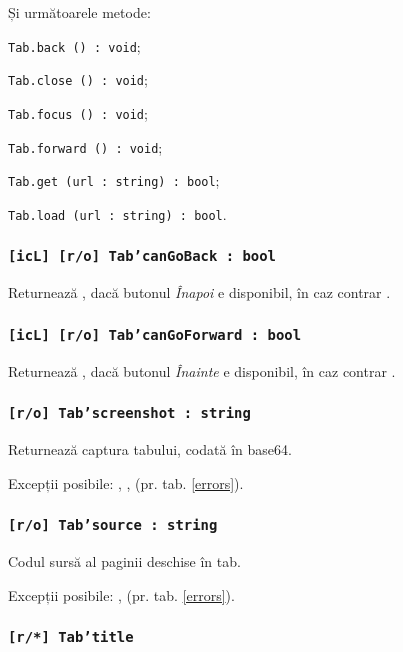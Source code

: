Și următoarele metode:
\begin{icItems}
	\item \texttt{Tab.back () : void};
	\item \texttt{Tab.close () : void};
	\item \texttt{Tab.focus () : void};
	\item \texttt{Tab.forward () : void};
	\item \texttt{Tab.get (url : string) : bool};
	\item \texttt{Tab.load (url : string) : bool}.
\end{icItems}

\subsubsection{\texttt{[icL] [r/o] Tab'canGoBack : bool}}

Returnează \true, dacă butonul \textit{Înapoi} e disponibil, în caz contrar \false.

\subsubsection{\texttt{[icL] [r/o] Tab'canGoForward : bool}}

Returnează \true, dacă butonul \textit{Înainte} e disponibil, în caz contrar \false.

\subsubsection{\texttt{[r/o] Tab'screenshot : string}}

Returnează captura tabului, codată în base64.

Excepții posibile: , ,  (pr. tab. \ref{errors}).

\subsubsection{\texttt{[r/o] Tab'source : string}}

Codul sursă al paginii deschise în tab.

Excepții posibile: ,  (pr. tab. \ref{errors}).

\subsubsection{\texttt{[r/*] Tab'title}}

